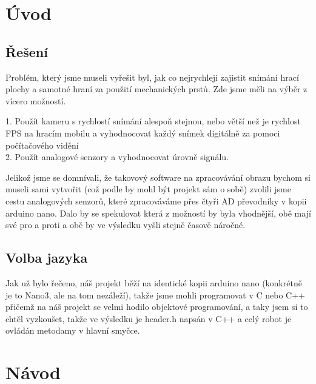 \documentclass[12pt,oneside]{book} %
\begin{document}
\chapter{Úvod}\label{progUvod}
\section{Řešení}\label{progRes}
\qquad Problém, který jsme museli vyřešit byl, jak co nejrychleji zajistit snímání hrací plochy a samotné hraní za použití mechanických prstů. Zde jsme měli na výběr z vícero možností. \par  1. Použít kameru s rychlostí snímání alespoň stejnou, nebo větší než je rychlost FPS na hracím mobilu a vyhodnocovat každý snímek digitálně za pomoci počítačového vidění \\ 2. Použít analogové senzory a vyhodnocovat úrovně signálu.\par \qquad Jelikož jsme se domnívali, že takovový software na zpracovávání obrazu bychom si museli sami vytvořit (což podle by mohl být projekt sám o sobě) zvolili jsme cestu analogových senzorů, které zpracováváme přes čtyři AD převodníky v kopii arduino nano. Dalo by se spekulovat která z možností by byla vhodnější, obě mají své pro a proti a obě by ve výsledku vyšli stejně časově náročné.

\section{Volba jazyka}
\qquad Jak už bylo řečeno, náš projekt běží na identické kopii arduino nano (konkrétně je to Nano3, ale na tom nezáleží), takže jsme mohli programovat v C nebo C++ přičemž na náš projekt se velmi hodilo objektové programování, a taky jsem si to chtěl vyzkoušet, takže ve výsledku je header.h napsán v C++ a celý robot je ovládán metodamy v hlavní smyčce.

\chapter{Návod}\label{progNavod}
\end{document}
